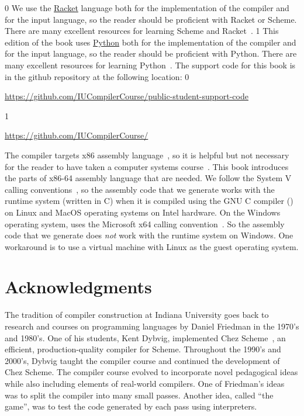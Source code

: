 \documentclass[7x10,nocrop]{TimesAPriori_MIT}%
\def\racketEd{0}
\def\pythonEd{1}
\def\edition{1}
\newcommand{\racket}[1]{{\if\edition\racketEd{#1}\fi}}
\newcommand{\python}[1]{{\if\edition\pythonEd #1\fi}}
\begin{document}
\racket{
We use the \href{https://racket-lang.org/}{Racket} language both for
the implementation of the compiler and for the input language, so the
reader should be proficient with Racket or Scheme. There are many
excellent resources for learning Scheme and
Racket~\citep{Dybvig:1987aa,Abelson:1996uq,Friedman:1996aa,Felleisen:2001aa,Felleisen:2013aa,Flatt:2014aa}.
}
\python{
  This edition of the book uses \href{https://www.python.org/}{Python}
  both for the implementation of the compiler and for the input language, so the
reader should be proficient with Python. There are many
excellent resources for learning Python~\citep{Lutz:2013vp,Barry:2016vj,Sweigart:2019vn,Matthes:2019vs}.
}
The support code for this book is in the github repository at
the following location:
\if\edition\racketEd
\begin{center}\small
  \url{https://github.com/IUCompilerCourse/public-student-support-code}
\end{center}
\fi
\if\edition\pythonEd
\begin{center}\small
  \url{https://github.com/IUCompilerCourse/}
\end{center}
\fi

The compiler targets x86 assembly language~\citep{Intel:2015aa}, so it
is helpful but not necessary for the reader to have taken a computer
systems course~\citep{Bryant:2010aa}. This book introduces the parts
of x86-64 assembly language that are needed.
%
We follow the System V calling
conventions~\citep{Bryant:2005aa,Matz:2013aa}, so the assembly code
that we generate works with the runtime system (written in C) when it
is compiled using the GNU C compiler () on Linux and MacOS
operating systems on Intel hardware.
%
On the Windows operating system,  uses the Microsoft x64
calling convention~\citep{Microsoft:2018aa,Microsoft:2020aa}. So the
assembly code that we generate does \emph{not} work with the runtime
system on Windows. One workaround is to use a virtual machine with
Linux as the guest operating system.

\section*{Acknowledgments}

The tradition of compiler construction at Indiana University goes back
to research and courses on programming languages by Daniel Friedman in
the 1970's and 1980's.  One of his students, Kent Dybvig, implemented
Chez Scheme~\citep{Dybvig:2006aa}, an efficient, production-quality
compiler for Scheme.  Throughout the 1990's and 2000's, Dybvig taught
the compiler course and continued the development of Chez Scheme.
%
The compiler course evolved to incorporate novel pedagogical ideas
while also including elements of real-world compilers.  One of
Friedman's ideas was to split the compiler into many small
passes. Another idea, called ``the game'', was to test the code
generated by each pass using interpreters.
\end{document}
